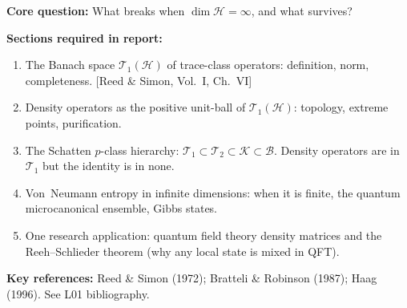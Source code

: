\documentclass[11pt,a4paper]{article}
\begin{document}
\bigskip

\begin{tcolorbox}[gradprobbox, title={Project CG1 --- Density Operators on Infinite-Dimensional Hilbert Spaces}]
\textbf{Core question:} What breaks when $\dim\mathcal{H}=\infty$, and what survives?

\medskip\textbf{Sections required in report:}
\begin{enumerate}[leftmargin=1.8em, label=\textbf{\arabic*.}, itemsep=6pt]
  \item The Banach space $\mathcal{T}_1(\mathcal{H})$ of trace-class operators:
        definition, norm, completeness. [Reed \& Simon, Vol.~I, Ch.~VI]
  \item Density operators as the positive unit-ball of $\mathcal{T}_1(\mathcal{H})$:
        topology, extreme points, purification.
  \item The Schatten $p$-class hierarchy: $\mathcal{T}_1\subset\mathcal{T}_2\subset\mathcal{K}\subset\mathcal{B}$.
        Density operators are in $\mathcal{T}_1$ but the identity is in none.
  \item Von~Neumann entropy in infinite dimensions: when it is finite,
        the quantum microcanonical ensemble, Gibbs states.
  \item One research application: quantum field theory density matrices and
        the Reeh--Schlieder theorem (why any local state is mixed in QFT).
\end{enumerate}

\medskip\textbf{Key references:} Reed \& Simon (1972); Bratteli \& Robinson (1987);
Haag (1996). See L01 bibliography.
\end{tcolorbox}

\bigskip
\end{document}
